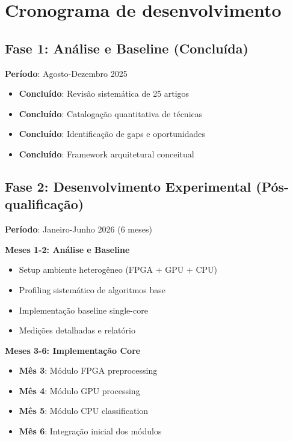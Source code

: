 \section{Cronograma de desenvolvimento}\label{sec:cronograma_desenvolvimento}

\subsection{Fase 1: Análise e Baseline (Concluída)}\label{subsec:fase1_analise}

\textbf{Período}: Agosto-Dezembro 2025
\begin{itemize}
    \item \textbf{Concluído}: Revisão sistemática de 25 artigos
    \item \textbf{Concluído}: Catalogação quantitativa de técnicas
    \item \textbf{Concluído}: Identificação de gaps e oportunidades
    \item \textbf{Concluído}: Framework arquitetural conceitual
\end{itemize}

\subsection{Fase 2: Desenvolvimento Experimental (Pós-qualificação)}\label{subsec:fase2_desenvolvimento}

\textbf{Período}: Janeiro-Junho 2026 (6 meses)

\textbf{Meses 1-2: Análise e Baseline}
\begin{itemize}
    \item Setup ambiente heterogêneo (FPGA + GPU + CPU)
    \item Profiling sistemático de algoritmos base
    \item Implementação baseline single-core
    \item Medições detalhadas e relatório
\end{itemize}

\textbf{Meses 3-6: Implementação Core}
\begin{itemize}
    \item \textbf{Mês 3}: Módulo FPGA preprocessing
    \item \textbf{Mês 4}: Módulo GPU processing
    \item \textbf{Mês 5}: Módulo CPU classification
    \item \textbf{Mês 6}: Integração inicial dos módulos
\end{itemize}

